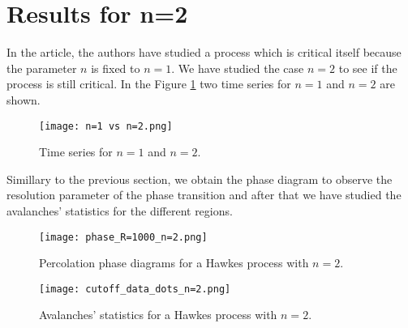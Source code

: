 \section{Results for n=2}

In the article, the authors have studied a process which is critical itself because the parameter $n$ is fixed to $n=1$. We have studied the case $n=2$ to see if the process is still critical. 
In the Figure \ref{f:n=1 vs n=2} two time series for $n=1$ and $n=2$ are shown. 

\begin{figure}[H]
    \centering
    \texttt{[image: n=1 vs n=2.png]}
    \caption{Time series for $n=1$ and $n=2$.}
    \label{f:n=1 vs n=2}
\end{figure}
Simillary to the previous section, we obtain the phase diagram to observe the resolution parameter of the phase transition and after that we have studied the avalanches' statistics for the different
regions.

\begin{figure}[H]
    \centering
    \texttt{[image: phase\_R=1000\_n=2.png]}
    \caption{Percolation phase diagrams for a Hawkes process with $n=2$.}
    \label{f:phase_diagram_n=2}
\end{figure}

\begin{figure}[H]
    \centering
    \texttt{[image: cutoff\_data\_dots\_n=2.png]}
    \caption{Avalanches' statistics for a Hawkes process with $n=2$.}
    \label{f:avalanches_n=2}
\end{figure}